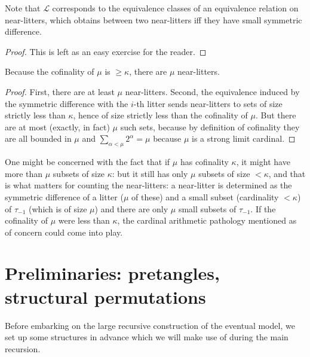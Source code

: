 \begin{lemma}
\label {lem:small-diff-equiv}
\leanok
{}
Note that $\mathcal L$ corresponds to the equivalence classes of an equivalence relation on near-litters, which obtains between two near-litters iff they have small symmetric difference.
\end{lemma}

\begin{proof}
\leanok
This is left as an easy exercise for the reader.
\end{proof}

\begin{lemma}
\label {lem:count-near-litters}
\leanok
{}
Because the cofinality of $\mu$ is $\geq \kappa$, there are $\mu$ near-litters.
\end{lemma}

\begin{proof}
\leanok
First, there are at least $\mu$ near-litters. Second, the equivalence induced by the symmetric difference with the $i$-th litter sends near-litters to sets of size strictly less than $\kappa$, hence of size strictly less than the cofinality of $\mu$. But there are at most (exactly, in fact) $\mu$ such sets, because by definition of cofinality they are all bounded in $\mu$ and $\sum_{\alpha < \mu} 2 ^ \alpha = \mu $ because $\mu$ is a strong limit cardinal.
\end{proof}

One might be concerned with the fact that if $\mu$ has cofinality $\kappa$, it might have more than $\mu$ subsets of size $\kappa$:  but it still has only $\mu$ subsets of size $<\kappa$, and that is what matters for counting the near-litters:  a near-litter is determined as the symmetric difference of a litter ($\mu$ of these) and a small subset (cardinality $<\kappa$) of $\tau_{-1}$ (which is of size $\mu$) and there are only $\mu$ small subsets of $\tau_{-1}$.  If the cofinality of $\mu$ were less than $\kappa$, the cardinal arithmetic pathology mentioned as of concern could come into play.

\section{Preliminaries: pretangles, structural permutations}

Before embarking on the large recursive construction of the eventual model, we set up some structures in advance which we will make use of during the main recursion.

